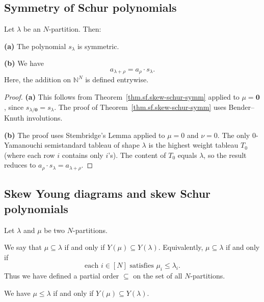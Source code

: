 \subsection{Symmetry of Schur polynomials}

\begin{theorem}
\label{thm.sf.schur-symm}
\leantarget
\leanok
Let $\lambda$ be an $N$-partition. Then:\medskip

\textbf{(a)} The polynomial $s_{\lambda}$ is symmetric. \medskip

\textbf{(b)} We have
\[
a_{\lambda+\rho}=a_{\rho}\cdot s_{\lambda}.
\]
Here, the addition on $\mathbb{N}^{N}$ is defined entrywise.
\end{theorem}

\begin{proof}
\textbf{(a)} This follows from Theorem~\ref{thm.sf.skew-schur-symm} applied
to $\mu = \mathbf{0}$, since $s_{\lambda/\mathbf{0}} = s_\lambda$.
The proof of Theorem~\ref{thm.sf.skew-schur-symm} uses Bender--Knuth involutions.

\textbf{(b)} The proof uses Stembridge's Lemma applied to $\mu = 0$ and $\nu = 0$.
The only $0$-Yamanouchi semistandard tableau of shape $\lambda$ is the
highest weight tableau $T_0$ (where each row $i$ contains only $i$'s).
The content of $T_0$ equals $\lambda$, so the result reduces to
$a_\rho \cdot s_\lambda = a_{\lambda + \rho}$.
\end{proof}

\subsection{Skew Young diagrams and skew Schur polynomials}

\begin{definition}
\label{def.sf.par-subset}
\leantarget
\leanok
Let $\lambda$ and $\mu$ be two $N$-partitions.

We say that $\mu\subseteq\lambda$ if and only if $Y\left(  \mu\right)
\subseteq Y\left(  \lambda\right)  $. Equivalently, $\mu\subseteq\lambda$ if
and only if%
\[
\text{each }i\in\left[  N\right]  \text{ satisfies }\mu_{i}\leq\lambda_{i}.
\]
Thus we have defined a partial order $\subseteq$ on
the set of all $N$-partitions.
\end{definition}

\begin{lemma}
\label{lem.sf.par-subset-iff-yd}
\leanhelper
\leanok
We have $\mu \le \lambda$ if and only if $Y(\mu) \subseteq Y(\lambda)$.
\end{lemma}

